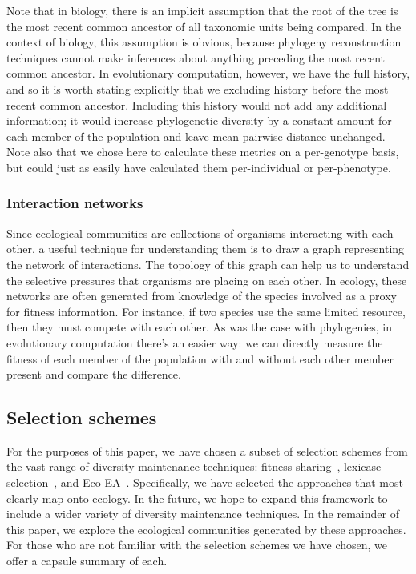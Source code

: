 Note that in biology, there is an implicit assumption that the root of the tree is the most recent common ancestor of all taxonomic units being compared. In the context of biology, this assumption is obvious, because phylogeny reconstruction techniques cannot make inferences about anything preceding the most recent common ancestor. In evolutionary computation, however, we have the full history, and so it is worth stating explicitly that we excluding history before the most recent common ancestor. Including this history would not add any additional information; it would increase phylogenetic diversity by a constant amount for each member of the population and leave mean pairwise distance unchanged. Note also that we chose here to calculate these metrics on a per-genotype basis, but could just as easily have calculated them per-individual or per-phenotype.

\subsubsection{Interaction networks}
Since ecological communities are collections of organisms interacting with each other, a useful technique for understanding them is to draw a graph representing the network of interactions. The topology of this graph can help us to understand the selective pressures that organisms are placing on each other. In ecology, these networks are often generated from knowledge of the species involved as a proxy for fitness information. For instance, if two species use the same limited resource, then they must compete with each other. As was the case with phylogenies, in evolutionary computation there's an easier way: we can directly measure the fitness of each member of the population with and without each other member present and compare the difference.

\subsection{Selection schemes}

For the purposes of this paper, we have chosen a subset of selection schemes from the vast range of diversity maintenance techniques: fitness sharing~\cite{goldberg_genetic_1987}, lexicase selection~\cite{spector_assessment_2012}, and Eco-EA~\cite{goings_ecological_2009}. Specifically, we have selected the approaches that most clearly map onto ecology. In the future, we hope to expand this framework to include a wider variety of diversity maintenance techniques. In the remainder of this paper, we explore the ecological communities generated by these approaches. For those who are not familiar with the selection schemes we have chosen, we offer a capsule summary of each.

